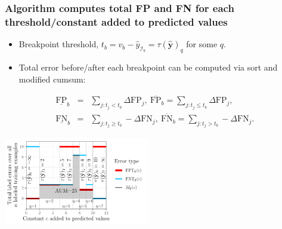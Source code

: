 \documentclass[t]{beamer}
\begin{document}
\begin{frame}
  \frametitle{Algorithm computes total FP and FN for each threshold/constant added to predicted values}
  \begin{itemize}
  \item Breakpoint threshold,
    $t_b= v_b - \hat y_{\mathcal I_b}=\tau(\mathbf{\hat y})_q$ for
    some $q$.
  \item Total error before/after each breakpoint can be computed via
    sort and modified cumsum:
  \end{itemize}
\begin{eqnarray*}
  \underline{\text{FP}}_b &=& \sum_{j: t_j < t_b} \Delta\text{FP}_j,\ 
  \overline{\text{FP}}_b = \sum_{j: t_j \leq t_b} \Delta\text{FP}_j, \\
  \underline{\text{FN}}_b &=& \sum_{j: t_j \geq t_b} - \Delta\text{FN}_j,\ 
  \overline{\text{FN}}_b = \sum_{j: t_j > t_b} - \Delta\text{FN}_j.
\end{eqnarray*}

  \includegraphics[height=1.5in]{figure-more-than-one-more-aum}

\end{frame}
\end{document}
